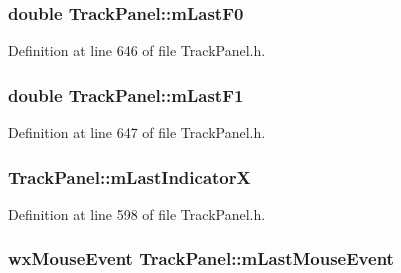 \subsubsection[{\texorpdfstring{m\+Last\+F0}{mLastF0}}]{\setlength{\rightskip}{0pt plus 5cm}double Track\+Panel\+::m\+Last\+F0\hspace{0.3cm}{\ttfamily [protected]}}\hypertarget{class_track_panel_aeb356a00eec72d012430064d6bc7d1b4}{}\label{class_track_panel_aeb356a00eec72d012430064d6bc7d1b4}


Definition at line 646 of file Track\+Panel.\+h.

\subsubsection[{\texorpdfstring{m\+Last\+F1}{mLastF1}}]{\setlength{\rightskip}{0pt plus 5cm}double Track\+Panel\+::m\+Last\+F1\hspace{0.3cm}{\ttfamily [protected]}}\hypertarget{class_track_panel_a40bb7daf14dcfad80db2488157da31f0}{}\label{class_track_panel_a40bb7daf14dcfad80db2488157da31f0}


Definition at line 647 of file Track\+Panel.\+h.

\subsubsection[{\texorpdfstring{m\+Last\+IndicatorX}{mLastIndicatorX}}]{ Track\+Panel\+::m\+Last\+IndicatorX\hspace{0.3cm}{\ttfamily [protected]}}\hypertarget{class_track_panel_a30d53afc3d2f99fbd024056c50e292bc}{}\label{class_track_panel_a30d53afc3d2f99fbd024056c50e292bc}


Definition at line 598 of file Track\+Panel.\+h.

\subsubsection[{\texorpdfstring{m\+Last\+Mouse\+Event}{mLastMouseEvent}}]{\setlength{\rightskip}{0pt plus 5cm}wx\+Mouse\+Event Track\+Panel\+::m\+Last\+Mouse\+Event\hspace{0.3cm}{\ttfamily [protected]}}\hypertarget{class_track_panel_a5979c1a1b36df3e78c7974e0dfc07c02}{}\label{class_track_panel_a5979c1a1b36df3e78c7974e0dfc07c02}


